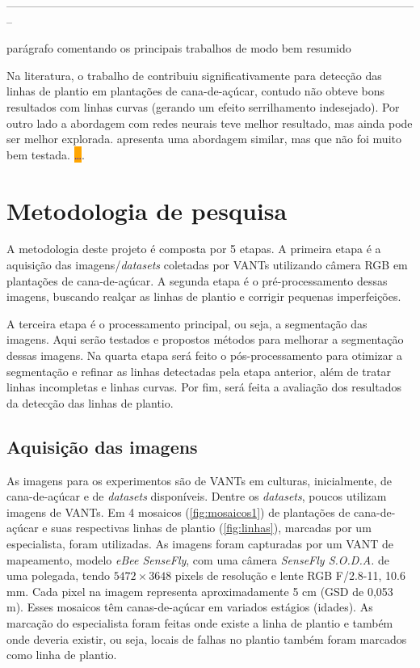 \documentclass[12pt, a4paper, english, brazil]{article}
\newcommand{\textRed}[1]{{{\color{red} #1}}}
\newcommand{\dotsBlue}{\colorbox{orange}{\textcolor{blue}{\dots}}}
\newcommand{\linePage}{--------------------------------------------------------------------------------------------------------------}
\begin{document}
\linePage

\textRed{parágrafo comentando os principais trabalhos de modo bem resumido}

Na literatura, o trabalho de  contribuiu significativamente para detecção das linhas de plantio em plantações de cana-de-açúcar, contudo não obteve bons resultados com linhas curvas (gerando um efeito serrilhamento indesejado). Por outro lado a abordagem com redes neurais teve melhor resultado, mas ainda pode ser melhor explorada.  apresenta uma abordagem similar, mas que não foi muito bem testada.  \dotsBlue.


\section{Metodologia de pesquisa}

A metodologia deste projeto é composta por 5 etapas. A primeira etapa é a aquisição das imagens/\textit{datasets} coletadas por VANTs utilizando câmera RGB em plantações de cana-de-açúcar. A segunda etapa é o pré-processamento dessas imagens, buscando realçar as linhas de plantio e corrigir pequenas imperfeições.

A terceira etapa é o processamento principal, ou seja, a segmentação das imagens. Aqui serão testados e propostos métodos para melhorar a segmentação dessas imagens. Na quarta etapa será feito o pós-processamento para otimizar a segmentação e refinar as linhas detectadas pela etapa anterior, além de tratar linhas incompletas e linhas curvas. Por fim, será feita a avaliação dos resultados da detecção das linhas de plantio.

\subsection{Aquisição das imagens}

As imagens para os experimentos são de VANTs em culturas, inicialmente, de cana-de-açúcar e de \textit{datasets} disponíveis. Dentre os \textit{datasets}, poucos utilizam imagens de VANTs. Em  4 mosaicos (\autoref{fig:mosaicos1}) de plantações de cana-de-açúcar e suas respectivas linhas de plantio (\autoref{fig:linhas}), marcadas por um especialista, foram utilizadas. As imagens foram capturadas por um VANT de mapeamento, modelo \textit{eBee SenseFly}, com uma câmera \textit{SenseFly S.O.D.A.} de uma polegada, tendo $5472\times3648$ pixels de resolução e lente RGB F/2.8-11, 10.6 mm. Cada pixel na imagem representa aproximadamente 5 cm (GSD de 0,053 m). Esses mosaicos têm canas-de-açúcar em variados estágios (idades). As marcação do especialista foram feitas onde existe a linha de plantio e também onde deveria existir, ou seja, locais de falhas no plantio também foram marcados como linha de plantio.
\end{document}
